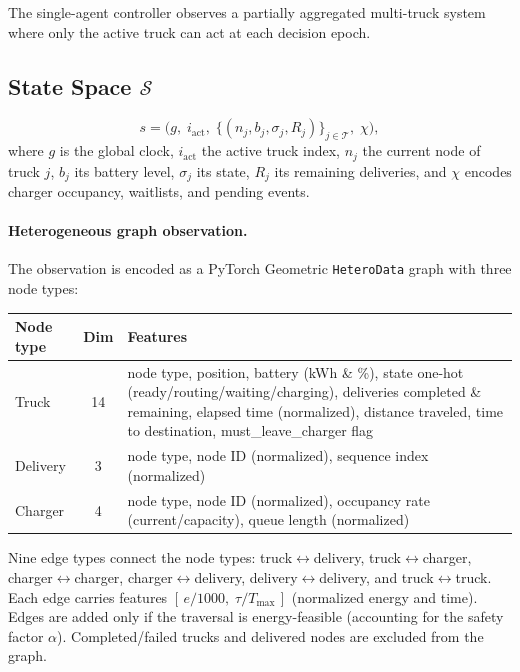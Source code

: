 \documentclass[11pt]{article}
\begin{document}
The single-agent controller observes a partially aggregated multi-truck system where only the active truck can act at each decision epoch.

\subsection{State Space $\mathcal{S}$}

\[
s = \big(g,\; i_{\text{act}},\; \{(n_j, b_j, \sigma_j, R_j)\}_{j\in\mathcal{T}},\; \chi\big),
\]
where $g$ is the global clock, $i_{\text{act}}$ the active truck index, $n_j$ the current node of truck $j$, $b_j$ its battery level, $\sigma_j$ its state, $R_j$ its remaining deliveries, and $\chi$ encodes charger occupancy, waitlists, and pending events.

\paragraph{Heterogeneous graph observation.}
The observation is encoded as a PyTorch Geometric \texttt{HeteroData} graph with three node types:

\medskip
\begin{center}
\begin{tabular}{@{}lcp{8.5cm}@{}}
\toprule
\textbf{Node type} & \textbf{Dim} & \textbf{Features} \\
\midrule
Truck & 14 & node type, position, battery (kWh \& \%), state one-hot (ready/routing/waiting/charging), deliveries completed \& remaining, elapsed time (normalized), distance traveled, time to destination, must\_leave\_charger flag \\
Delivery & 3 & node type, node ID (normalized), sequence index (normalized) \\
Charger & 4 & node type, node ID (normalized), occupancy rate (current/capacity), queue length (normalized) \\
\bottomrule
\end{tabular}
\end{center}
\medskip

Nine edge types connect the node types: truck$\leftrightarrow$delivery, truck$\leftrightarrow$charger, charger$\leftrightarrow$charger, charger$\leftrightarrow$delivery, delivery$\leftrightarrow$delivery, and truck$\leftrightarrow$truck. Each edge carries features $[\,e/1000,\;\tau/T_{\max}\,]$ (normalized energy and time). Edges are added only if the traversal is energy-feasible (accounting for the safety factor $\alpha$). Completed/failed trucks and delivered nodes are excluded from the graph.
\end{document}
